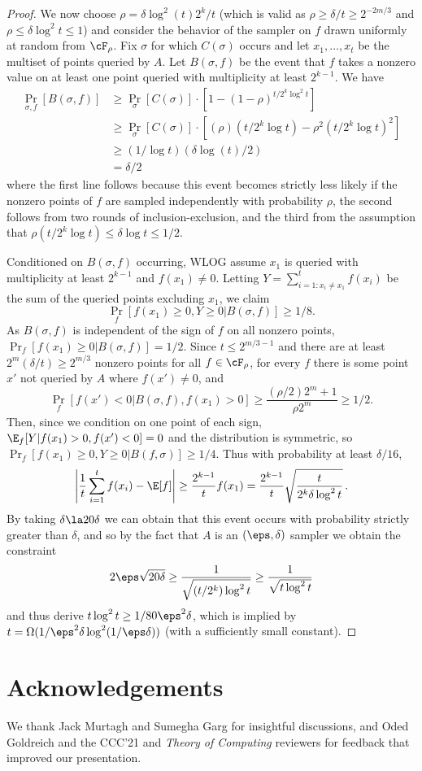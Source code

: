 \begin{proof}
We now choose $\rho=\delta\log^2(t)2^k/t$ (which is valid as $\rho\geq \delta/t\geq 2^{-2m/3}$ and $\rho\leq \delta\log^2 t\leq 1$) and consider the behavior of the sampler on $f$ drawn uniformly at random from $\cF_\rho$. Fix $\sigma$ for which $C(\sigma)$ occurs and let $x_1,\ldots,x_t$ be the multiset of points queried by $A$. Let $B(\sigma,f)$ be the event that $f$ takes a nonzero value on at least one point queried with multiplicity at least $2^{k-1}$. We have
\begin{align*}
    \Pr_{\sigma,f}[B(\sigma,f)] &\geq \Pr_\sigma[C(\sigma)]\cdot \left[1-(1-\rho)^{t/2^k\log^2 t}\right]\\
    &\geq \Pr_\sigma[C(\sigma)]\cdot\left[(\rho)(t/2^k\log t)-\rho^2(t/2^k\log t)^2\right]\\
    &\geq (1/\log t)(\delta \log(t)/2)\\
    &= \delta/2%
\end{align*}
%
where %
the first line follows because this event becomes strictly less likely if the nonzero points of $f$ are sampled independently with probability $\rho$, the second follows from two rounds of inclusion-exclusion, and the third from the assumption that $\rho(t/2^k\log t)\leq \delta\log t\leq 1/2$. 

Conditioned on $B(\sigma,f)$ occurring, WLOG assume $x_1$ is queried with multiplicity at least $2^{k-1}$ and $f(x_1)\neq 0$. 
Letting $Y=\sum_{i=1:x_i\neq x_1}^tf(x_i)$ be the sum of the queried points excluding $x_1$, we claim
\[\Pr_{f}[f(x_1)\geq 0,Y\geq 0|B(\sigma,f)]\geq 1/8.\]
As $B(\sigma,f)$ is independent of the sign of $f$ on all nonzero points, $\Pr_f[f(x_1)\geq 0|B(\sigma,f)]=1/2$. Since $t \leq 2^{m/3-1}$ and there are at least $2^m(\delta/t)\geq 2^{m/3}$ nonzero points for all $f\in \cF_\rho$, for every $f$ there is some point $x'$ not queried by $A$ where $f(x')\neq 0$, and
\[\Pr_f[f(x')<0|B(\sigma,f),f(x_1)>0]\geq \frac{(\rho/2)2^m+1}{\rho 2^m}\geq 1/2.\]
Then, %
since we condition on one point of each sign, $\E_{f}[Y|f(x_1)>0,f(x')<0]=0$ and the distribution is symmetric, so $\Pr_{f}[f(x_1)\geq 0,Y\geq 0|B(f,\sigma)]\geq 1/4$. Thus with probability at least $\delta/16$,
\[\left|\frac{1}{t}\sum_{i=1}^tf(x_i)-\E[f]\right|\geq \frac{2^{k-1}}{t}f(x_1)=  \frac{2^{k-1}}{t}\sqrt{\frac{t}{2^k\delta\log^2t}}\,. \]  %
By taking $\delta\la 20\delta$ we can obtain that this event occurs with probability strictly greater than $\delta$, and so by the fact that $A$ is an $(\eps,\delta)$ sampler we obtain the constraint
\[2\eps\sqrt{20\delta} \geq \frac{1}{\sqrt{(t/2^k)\log^2t}} \geq \frac{1}{\sqrt{t\log^2 t}}\]
and thus derive $t\log^2 t\geq 1/80\eps^2\delta$, which is implied by $t=\Omega(1/\eps^2\delta\log^2(1/\eps\delta))$ (with a sufficiently small constant).
\end{proof}
\section{Acknowledgements}
We thank Jack Murtagh and Sumegha Garg for insightful discussions, and 
Oded Goldreich and the CCC'21 and \emph{Theory of Computing} reviewers
for feedback that improved our presentation.


